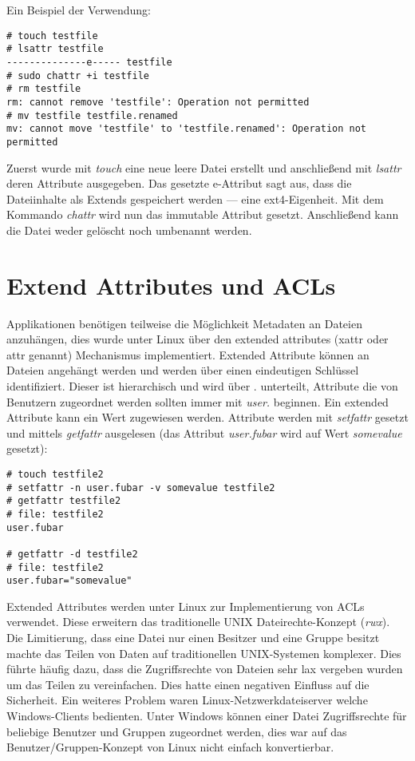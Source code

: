 Ein Beispiel der Verwendung:

\begin{verbatim}
# touch testfile                                    
# lsattr testfile   
--------------e----- testfile
# sudo chattr +i testfile 
# rm testfile                                                                                               
rm: cannot remove 'testfile': Operation not permitted
# mv testfile testfile.renamed                                                              
mv: cannot move 'testfile' to 'testfile.renamed': Operation not permitted
\end{verbatim}

Zuerst wurde mit \textit{touch} eine neue leere Datei erstellt und anschließend mit \textit{lsattr} deren Attribute ausgegeben. Das gesetzte e-Attribut sagt aus, dass die Dateiinhalte als Extends gespeichert werden --- eine ext4-Eigenheit. Mit dem Kommando \textit{chattr} wird nun das immutable Attribut gesetzt. Anschließend kann die Datei weder gelöscht noch umbenannt werden.

\section{Extend Attributes und ACLs}

Applikationen benötigen teilweise die Möglichkeit Metadaten an Dateien anzuhängen, dies wurde unter Linux über den extended attributes (xattr oder attr genannt) Mechanismus implementiert. Extended Attribute können an Dateien angehängt werden und werden über einen eindeutigen Schlüssel identifiziert. Dieser ist hierarchisch und wird über . unterteilt, Attribute die von Benutzern zugeordnet werden sollten immer mit \textit{user.} beginnen. Ein extended Attribute kann ein Wert zugewiesen werden. Attribute werden mit \textit{setfattr} gesetzt und mittels \textit{getfattr} ausgelesen (das Attribut \textit{user.fubar} wird auf Wert \textit{somevalue} gesetzt):

\begin{verbatim}
# touch testfile2                             
# setfattr -n user.fubar -v somevalue testfile2
# getfattr testfile2  
# file: testfile2
user.fubar

# getfattr -d testfile2
# file: testfile2
user.fubar="somevalue"
\end{verbatim}

Extended Attributes werden unter Linux zur Implementierung von ACLs verwendet. Diese erweitern das traditionelle UNIX Dateirechte-Konzept (\textit{rwx}). Die Limitierung, dass eine Datei nur einen Besitzer und eine Gruppe besitzt machte das Teilen von Daten auf traditionellen UNIX-Systemen komplexer. Dies führte häufig dazu, dass die Zugriffsrechte von Dateien sehr lax vergeben wurden um das Teilen zu vereinfachen. Dies hatte einen negativen Einfluss auf die Sicherheit. Ein weiteres Problem waren Linux-Netzwerkdateiserver welche Windows-Clients bedienten. Unter Windows können einer Datei Zugriffsrechte für beliebige Benutzer und Gruppen zugeordnet werden, dies war auf das Benutzer/Gruppen-Konzept von Linux nicht einfach konvertierbar.

